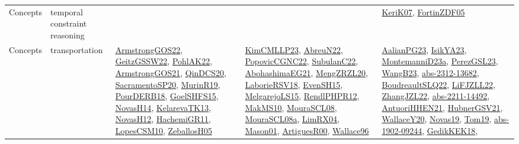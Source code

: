 {\begin{longtable}{lp{3cm}>{\raggedright}p{6cm}>{\raggedright}p{6cm}p{8cm}}
Concepts & temporal constraint reasoning &  &  & \href{papers/KeriK07.pdf}{KeriK07}\cite{KeriK07}, \href{papers/FortinZDF05.pdf}{FortinZDF05}\cite{FortinZDF05}\\
Concepts & transportation & \href{papers/ArmstrongGOS22.pdf}{ArmstrongGOS22}\cite{ArmstrongGOS22}, \href{papers/GeitzGSSW22.pdf}{GeitzGSSW22}\cite{GeitzGSSW22}, \href{articles/PohlAK22.pdf}{PohlAK22}\cite{PohlAK22}, \href{papers/ArmstrongGOS21.pdf}{ArmstrongGOS21}\cite{ArmstrongGOS21}, \href{articles/QinDCS20.pdf}{QinDCS20}\cite{QinDCS20}, \href{articles/SacramentoSP20.pdf}{SacramentoSP20}\cite{SacramentoSP20}, \href{papers/MurinR19.pdf}{MurinR19}\cite{MurinR19}, \href{articles/PourDERB18.pdf}{PourDERB18}\cite{PourDERB18}, \href{articles/GoelSHFS15.pdf}{GoelSHFS15}\cite{GoelSHFS15}, \href{articles/NovasH14.pdf}{NovasH14}\cite{NovasH14}, \href{papers/KelarevaTK13.pdf}{KelarevaTK13}\cite{KelarevaTK13}, \href{articles/NovasH12.pdf}{NovasH12}\cite{NovasH12}, \href{articles/HachemiGR11.pdf}{HachemiGR11}\cite{HachemiGR11}, \href{articles/LopesCSM10.pdf}{LopesCSM10}\cite{LopesCSM10}, \href{articles/ZeballosH05.pdf}{ZeballosH05}\cite{ZeballosH05} & \href{papers/KimCMLLP23.pdf}{KimCMLLP23}\cite{KimCMLLP23}, \href{articles/AbreuN22.pdf}{AbreuN22}\cite{AbreuN22}, \href{papers/PopovicCGNC22.pdf}{PopovicCGNC22}\cite{PopovicCGNC22}, \href{articles/SubulanC22.pdf}{SubulanC22}\cite{SubulanC22}, \href{articles/AbohashimaEG21.pdf}{AbohashimaEG21}\cite{AbohashimaEG21}, \href{articles/MengZRZL20.pdf}{MengZRZL20}\cite{MengZRZL20}, \href{articles/LaborieRSV18.pdf}{LaborieRSV18}\cite{LaborieRSV18}, \href{papers/EvenSH15.pdf}{EvenSH15}\cite{EvenSH15}, \href{papers/MelgarejoLS15.pdf}{MelgarejoLS15}\cite{MelgarejoLS15}, \href{papers/RendlPHPR12.pdf}{RendlPHPR12}\cite{RendlPHPR12}, \href{papers/MakMS10.pdf}{MakMS10}\cite{MakMS10}, \href{papers/MouraSCL08.pdf}{MouraSCL08}\cite{MouraSCL08}, \href{papers/MouraSCL08a.pdf}{MouraSCL08a}\cite{MouraSCL08a}, \href{papers/LimRX04.pdf}{LimRX04}\cite{LimRX04}, \href{articles/Mason01.pdf}{Mason01}\cite{Mason01}, \href{articles/ArtiguesR00.pdf}{ArtiguesR00}\cite{ArtiguesR00}, \href{articles/Wallace96.pdf}{Wallace96}\cite{Wallace96} & \href{papers/AalianPG23.pdf}{AalianPG23}\cite{AalianPG23}, \href{articles/IsikYA23.pdf}{IsikYA23}\cite{IsikYA23}, \href{articles/MontemanniD23a.pdf}{MontemanniD23a}\cite{MontemanniD23a}, \href{papers/PerezGSL23.pdf}{PerezGSL23}\cite{PerezGSL23}, \href{papers/WangB23.pdf}{WangB23}\cite{WangB23}, \href{articles/abs-2312-13682.pdf}{abs-2312-13682}\cite{abs-2312-13682}, \href{papers/BoudreaultSLQ22.pdf}{BoudreaultSLQ22}\cite{BoudreaultSLQ22}, \href{papers/LiFJZLL22.pdf}{LiFJZLL22}\cite{LiFJZLL22}, \href{papers/ZhangJZL22.pdf}{ZhangJZL22}\cite{ZhangJZL22}, \href{articles/abs-2211-14492.pdf}{abs-2211-14492}\cite{abs-2211-14492}, \href{papers/AntuoriHHEN21.pdf}{AntuoriHHEN21}\cite{AntuoriHHEN21}, \href{articles/HubnerGSV21.pdf}{HubnerGSV21}\cite{HubnerGSV21}, \href{articles/WallaceY20.pdf}{WallaceY20}\cite{WallaceY20}, \href{articles/Novas19.pdf}{Novas19}\cite{Novas19}, \href{papers/Tom19.pdf}{Tom19}\cite{Tom19}, \href{articles/abs-1902-09244.pdf}{abs-1902-09244}\cite{abs-1902-09244}, \href{articles/GedikKEK18.pdf}{GedikKEK18}\cite{GedikKEK18}, 
\end{longtable}}

